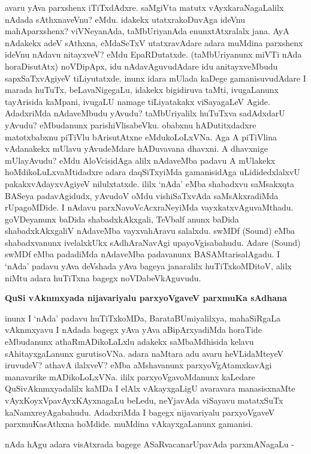 avaru yAva parxshenx iTiTxdAdxre. saMgiVta matutx vAyxkaraNagaLalilx nAdada sAthxnaveVnu? eMdu. idakekx utatxrakoDuvAga ideVnu mahAparxshenx? viVNeyanAda, taMbUriyanAda enunxtAtxralalx jana. AyA nAdakekx adeV sAthxna, eMdaSeTxV utatxravAdare adara muMdina parxshenx ideVnu nAdavu nitayxveV? eMdu EpaRDutatxde. (taMbUriyanunx miVTi nAda horaDisutAtx) noVDipApx, idu nAdavAguvudAdare idu anitayxveMbudu sapxSaTxvAgiyeV tiLiyutatxde. inunx idara mUlada kaDege gamanisuvudAdare I marada huTuTx, beLavaNigegaLu, idakekx bigidiruva taMti, ivugaLanunx tayArisida kaMpani, ivugaLU namage tiLiyatakakx viSayagaLeV Agide. AdadxriMda nAdaveMbudu yAvudu? taMbUriyalilx huTuTxva sadAdxdarU yAvudu? eMbudanunx parishiVlisabeVku. obabxnu hADutitxdadxre matotxbabxnu piTiVlu bArisutAtxne eMdukoLoLxVNa. Aga A piTiVlina vAdanakekx mUlavu yAvudeMdare hADuvavana dhavxni. A dhavxnige mUlayAvudu? eMdu AloVcisidAga alilx nAdaveMba padavu A mUlakekx hoMdikoLuLxvaMtidadxre adara daqSiTxyiMda gamanisidAga uLididedxlalxvU pakakxvAdayxvAgiyeV nilulxtatxde. ililx `nAda' eMba shabadxvu saMsakxqta BASeya padavAgidudx, yAvudoV oMdu vishiSaTxvAda saMsAkxradiMda rUpagoMDide. I nAdavu parxNavoVcAcxraNeyiMda vayxkatxvAguvaMthadu. goVDeyanunx baDida shabadxkAkxgali, TeVbalf anunx baDida shabadxkAkxgaliV nAdaveMba vayxvahAravu salalxdu. swMDf {\rm (Sound)} eMba shabadxvanunx ivelalxkUkx sAdhAraNavAgi upayoVgisabahudu. Adare {\rm (Sound)} swMDf eMba padadiMda nAdaveMba padavanunx BASAMtarisalAgadu. I `nAda' padavu yAva deVshada yAva bageya janaralilx huTiTxkoMDitoV, alilx niMtu adara huTiTxna bagegx noVDabeVkAguvudu.

\noindent
{\bf\large{QuSi vAknmxyada nijavariyalu parxyoVgaveV parxmuKa sAdhana}}\label{page143}

inunx I `nAda' padavu huTiTxkoMDa, BarataBUmiyalilxya, mahaSiRgaLa vAknmxyavu I nAdada bagegx yAva yAva aBipArxyadiMda horaTide eMbudanunx athaRmADikoLaLxlu adakekx saMbaMdhisida kelavu sAhitayxgaLanunx gurutisoVNa. adara naMtara adu avaru heVLidaMteyeV iruvudeV? athavA ilalxveV? eMba aMshavanunx parxyoVgAtamxkavAgi manavarike mADikoLoLxVNa. ililx parxyoVgavoMdanunx kaLedare QuSivAknmxyadalilx kaMDa I elAlx vAkayxgaLigU avaravara manasisxnaMte vAyxKoyxVpavAyxKAyxnagaLu beLedu, neYjavAda viSayavu matatxSuTx kaNamxreyAgabahudu. AdadxriMda I bagegx nijavariyalu parxyoVgaveV parxmuKasAthxna hoMdide. muMdina vAkayxgaLanunx gamanisi.

nAda hAgu adara visAtxrada bagege ASaRvacanarUpavAda parxmANagaLu -

